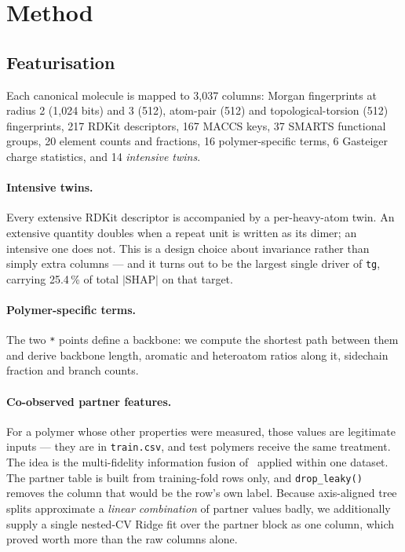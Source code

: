 \documentclass[11pt,a4paper]{article}
\newcommand{\prop}[1]{\texttt{#1}}
\begin{document}
\section{Method}

\subsection{Featurisation}

Each canonical molecule is mapped to 3{,}037 columns: Morgan fingerprints at
radius 2 (1{,}024 bits) and 3 (512), atom-pair (512) and topological-torsion
(512) fingerprints, 217 RDKit descriptors, 167 MACCS keys, 37 SMARTS functional
groups, 20 element counts and fractions, 16 polymer-specific terms, 6 Gasteiger
charge statistics, and 14 \emph{intensive twins}.

\paragraph{Intensive twins.} Every extensive RDKit descriptor is accompanied by
a per-heavy-atom twin. An extensive quantity doubles when a repeat unit is
written as its dimer; an intensive one does not. This is a design choice about
invariance rather than simply extra columns --- and it turns out to be the
largest single driver of \prop{tg}, carrying 25.4\,\% of total $|$SHAP$|$ on that
target.

\paragraph{Polymer-specific terms.} The two \texttt{*} points define a backbone:
we compute the shortest path between them and derive backbone length, aromatic
and heteroatom ratios along it, sidechain fraction and branch counts.

\paragraph{Co-observed partner features.} For a polymer whose other properties
were measured, those values are legitimate inputs --- they are in
\texttt{train.csv}, and test polymers receive the same treatment. The idea is the
multi-fidelity information fusion of~\cite{venkatram2020} applied within one dataset. The partner
table is built from training-fold rows only, and \texttt{drop\_leaky()} removes
the column that would be the row's own label. Because axis-aligned tree splits
approximate a \emph{linear combination} of partner values badly, we additionally
supply a single nested-CV Ridge fit over the partner block as one column, which
proved worth more than the raw columns alone.
\end{document}
